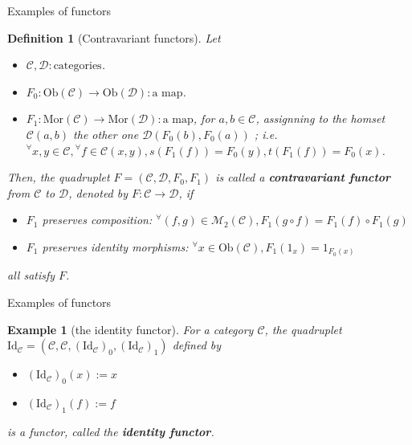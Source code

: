 \documentclass[dvipdfmx,10pt,notheorems]{beamer}
\newtheorem{definition}[theorem]{Definition}
\newtheorem{example}[theorem]{Example}
\renewcommand{\#}{^\sharp}
\begin{document}
	\begin{frame}{Examples of functors}
			\begin{definition}[Contravariant functors]
					Let 
							\begin{itemize}
									\item $\mathcal{C},\mathcal{D}:\mbox{categories}$.
									\item $F_0: \mathrm{Ob}(\mathcal{C})\rightarrow \mathrm{Ob}(\mathcal{D}):
									\mbox{a map}$.
									\item $F_1: \mathrm{Mor}(\mathcal{C})\rightarrow \mathrm{Mor}(\mathcal{D}):
									\mbox{a map}$,  for $ a,b\in \mathcal{C}$, assignning to the
									 homset $\mathcal{C}(a,b)$ the other one
									 $\mathcal{D}(F_0(b),F_0(a))$ ; i.e.
									${}^\forall x,y\in\mathcal{C}, {}^\forall f\in\mathcal{C}(x,y), s(F_1(f))=F_0(y), t(F_1(f))=F_0(x)$.

							\end{itemize}
					Then,
					the quadruplet $F=(\mathcal{C},\mathcal{D},F_0,F_1)$
					is called a {\bf contravariant functor} from $\mathcal{C}$ to $\mathcal{D}$,
					denoted by $F:\mathcal{C}\rightarrow\mathcal{D}$, if
							\begin{itemize}
									\item $F_1$ preserves composition:
									$^\forall (f,g)\in\mathcal{M}_2(\mathcal{C}), F_1(g\circ f)=F_1(f)\circ F_1(g)$
									\item  $F_1$ preserves identity morphisms:
									$^\forall x\in\mathrm{Ob}(\mathcal{C}), F_1(1_x)=1_{F_0(x)}$
							\end{itemize}
					all satisfy $F$.
					
			\end{definition}
	\end{frame}

	
	
	
	\begin{frame}{Examples of functors}
			\begin{example}[the identity functor]
					For a category $\mathcal{C}$, the quadruplet $\mathrm{Id}_\mathcal{C}=(\mathcal{C},\mathcal{C},
					(\mathrm{Id}_\mathcal{C})_0,(\mathrm{Id}_\mathcal{C})_1)$ defined by
							\begin{itemize}
									\item $(\mathrm{Id}_\mathcal{C})_0(x):=x$
									\item $(\mathrm{Id}_\mathcal{C})_1(f):=f$
							\end{itemize}
					is a functor, called the {\bf identity functor}.
			\end{example}
	\end{frame}
\end{document}
